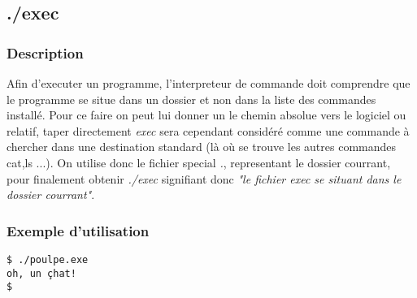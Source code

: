 \subsection{./exec}
\subsubsection{Description}
Afin d'executer un programme, l'interpreteur de commande doit comprendre que le programme se situe dans un dossier et non dans la liste des commandes installé.
Pour ce faire on peut lui donner un le chemin absolue vers le logiciel ou relatif, taper directement \emph{exec} sera cependant considéré comme une commande à chercher dans une destination standard (là où se trouve les autres commandes cat,ls ...).
On utilise donc le fichier special \emph{.}, representant le dossier courrant, pour finalement obtenir \emph{./exec} signifiant donc \emph{"le fichier exec se situant dans le dossier courrant"}.

\subsubsection{Exemple d'utilisation}
\begin{lstlisting}
$ ./poulpe.exe
oh, un çhat!
$ 
\end{lstlisting}
